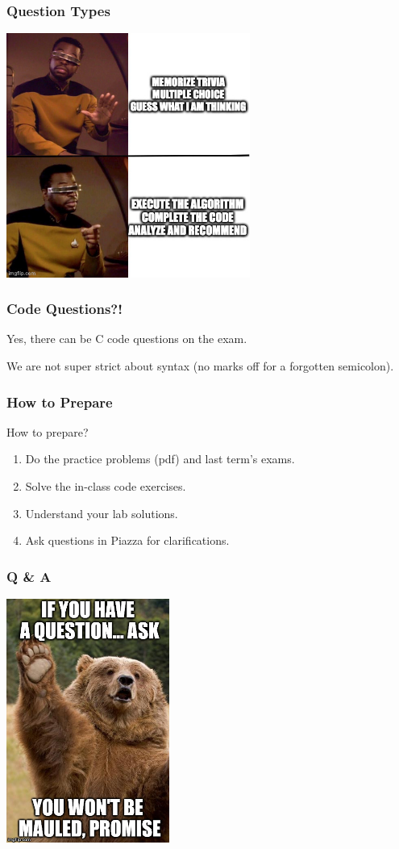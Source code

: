 \begin{frame}
\frametitle{Question Types}

\begin{center}
	\includegraphics[width=0.6\textwidth]{images/midterm-questions.jpg}
\end{center}

\end{frame}

\begin{frame}
\frametitle{Code Questions?!}

Yes, there can be C code questions on the exam.

We are not super strict about syntax (no marks off for a forgotten semicolon).


\end{frame}

\begin{frame}
\frametitle{How to Prepare}

How to prepare?

\begin{enumerate}
	\item Do the practice problems (pdf) and last term's exams.
	\item Solve the in-class code exercises.
	\item Understand your lab solutions.
	\item Ask questions in Piazza for clarifications.
\end{enumerate}

\end{frame}


\begin{frame}
\frametitle{Q \& A}

\begin{center}
	\includegraphics[width=0.4\textwidth]{images/question-bear.jpeg}
\end{center}


\end{frame}







